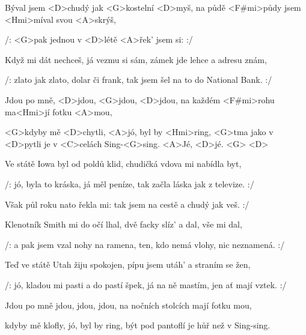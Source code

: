 

\zs
Býval jsem <D>chudý jak <G>kostelní <D>myš,
na půdě <F#mi>půdy jsem <Hmi>míval svou <A>skrýš,

/: <G>pak jednou v <D>létě <A>řek' jsem si:  :/
\ks

\zs
Když mi dát nechceš, já vezmu si sám,
zámek jde lehce a adresu znám,

/: zlato jak zlato, dolar či frank,
tak jsem šel na to do National Bank. :/
\ks

\zr
Jdou po mně, <D>jdou, <G>jdou, <D>jdou,
na každém <F#mi>rohu ma<Hmi>jí fotku <A>mou,

<G>kdyby mě <D>chytli, <A>jó, byl by <Hmi>ring,
<G>tma jako v <D>pytli je v <C>celách Sing-<G>sing. <A>Jé, <D>jé. <G> <D>
\kr

\zs
Ve státě Iowa byl od poldů klid,
chudičká vdova mi nabídla byt,

/: jó, byla to kráska, já měl peníze,
tak začla láska jak z televize. :/
\ks

\zs
Však půl roku nato řekla mi: 
tak jsem na cestě a chudý jak veš. :/
\ks

\zr \kr

\zs
Klenotník Smith mi do očí lhal,
dvě facky slíz' a dal, vše mi dal,

/: a pak jsem vzal nohy na ramena,
ten, kdo nemá vlohy, nic neznamená. :/
\ks

\zs
Teď ve státě Utah žiju spokojen,
pípu jsem utáh' a straním se žen,

/: jó, kladou mi pasti a do pastí špek,
já na ně mastím, jen ať mají vztek. :/
\ks

\zr
Jdou po mně jdou, jdou, jdou,
na nočních stolcích mají fotku mou,

kdyby mě klofly, jó, byl by ring,
být pod pantoflí je hůř než v Sing-sing.
\kr

\kp
